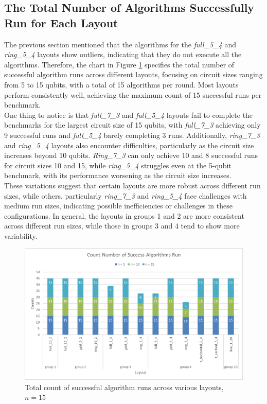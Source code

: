 \subsection{The Total Number of Algorithms Successfully Run for Each Layout}
The previous section mentioned that the algorithms for the \textit{full\_5\_4} and \textit{ring\_5\_4} layouts show outliers, indicating that they do not execute all the algorithms. Therefore, the chart in Figure \ref{fig:chart-success-algorithm-run} specifies the total number of successful algorithm runs across different layouts, focusing on circuit sizes ranging from 5 to 15 qubits, with a total of 15 algorithms per round. Most layouts perform consistently well, achieving the maximum count of 15 successful runs per benchmark. \\
One thing to notice is that \textit{full\_7\_3} and \textit{full\_5\_4}  layouts fail to complete the benchmarks for the largest circuit size of 15 qubits, with \textit{full\_7\_3} achieving only 9 successful runs and \textit{full\_5\_4} barely completing 3 runs. Additionally, \textit{ring\_7\_3} and \textit{ring\_5\_4} layouts also encounter difficulties, particularly as the circuit size increases beyond 10 qubits. \textit{Ring\_7\_3} can only achieve 10 and 8 successful runs for circuit sizes 10 and 15, while \textit{ring\_5\_4} struggles even at the 5-qubit benchmark, with its performance worsening as the circuit size increases. \\
These variations suggest that certain layouts are more robust across different run sizes, while others, particularly \textit{ring\_7\_3} and \textit{ring\_5\_4} face challenges with medium run sizes, indicating possible inefficiencies or challenges in these configurations. In general, the layouts in groups 1 and 2 are more consistent across different run sizes, while those in groups 3 and 4 tend to show more variability. \\
\begin{figure}[htb]
    \centering
    \includegraphics[width=0.8\linewidth]{image/chart_success_algorithm_run.png}
    \caption{Total count of successful algorithm runs across various layouts, $n = 15$}
    \label{fig:chart-success-algorithm-run}
\end{figure}
